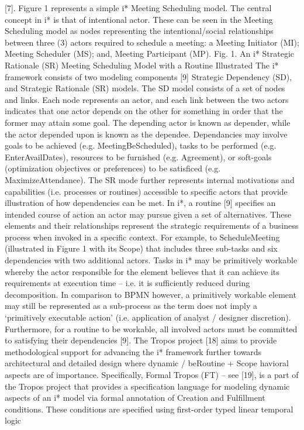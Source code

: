 [7]. Figure 1 represents a simple i* Meeting Scheduling model. The central concept
in i* is that of intentional actor. These can be seen in the Meeting Scheduling model
as nodes representing the intentional/social relationships between three (3) actors
required to schedule a meeting: a Meeting Initiator (MI); Meeting Scheduler (MS);
and, Meeting Participant (MP).
Fig. 1. An i* Strategic Rationale (SR) Meeting Scheduling Model with a Routine Illustrated
The i* framework consists of two modeling components [9] Strategic Dependency
(SD), and Strategic Rationale (SR) models. The SD model consists of a set of nodes
and links. Each node represents an actor, and each link between the two actors indicates that one actor depends on the other for something in order that the former may
attain some goal. The depending actor is known as depender, while the actor depended upon is known as the dependee. Dependancies may involve goals to be
achieved (e.g. MeetingBeScheduled), tasks to be performed (e.g. EnterAvailDates),
resources to be furnished (e.g. Agreement), or soft-goals (optimization objectives or
preferences) to be satisficed (e.g. MaximizeAttendance).
The SR mode further represents internal motivations and capabilities (i.e. processes or routines) accessible to specific actors that provide illustration of how dependencies can be met. In i*, a routine [9] specifies an intended course of action an
actor may pursue given a set of alternatives. These elements and their relationships
represent the strategic requirements of a business process when invoked in a specific
context. For example, to ScheduleMeeting (illustrated in Figure 1 with its Scope) that
includes three sub-tasks and six dependencies with two additional actors. Tasks in i*
may be primitively workable whereby the actor responsible for the element believes
that it can achieve its requirements at execution time – i.e. it is sufficiently reduced
during decomposition. In comparison to BPMN however, a primitively workable
element may still be represented as a sub-process as the term does not imply a ‘primitively executable action’ (i.e. application of analyst / designer discretion). Furthermore, for a routine to be workable, all involved actors must be committed to satisfying their dependencies [9].
The Tropos project [18] aims to provide methodological support for advancing the
i* framework further towards architectural and detailed design where dynamic / beRoutine
+ Scope
havioral aspects are of importance. Specifically, Formal Tropos (FT) – see [19], is a
part of the Tropos project that provides a specification language for modeling dynamic aspects of an i* model via formal annotation of Creation and Fulfillment conditions. These conditions are specified using first-order typed linear temporal logic
